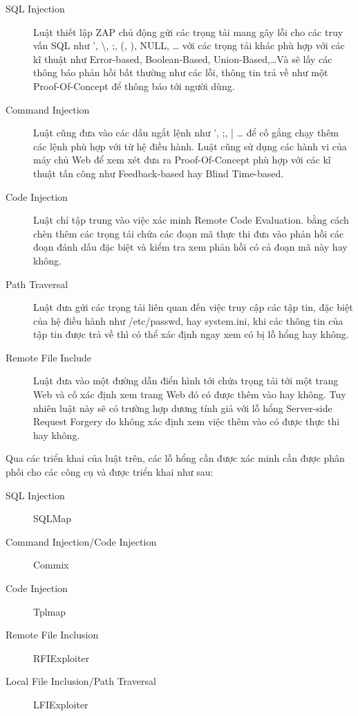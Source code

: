 \documentclass[./../main.tex]{subfiles}
\begin{document}
\begin{description}
	\item[SQL Injection] Luật thiết lập ZAP chủ động gửi các trọng tải mang
	      gây lỗi cho các truy vấn SQL như ', \textbackslash, ;, (, ), NULL, \ldots
	      với các trọng tải khác phù hợp với các kĩ thuật như Error-based, Boolean-Based,
	      Union-Based,\ldots Và sẽ lấy các thông báo phản hồi bất thường như
	      các lỗi, thông tin trả về như một Proof-Of-Concept để thông báo tới
	      người dùng.
	\item[Command Injection] Luật cũng đưa vào các dấu ngắt lệnh như ', ;, | \ldots
	      để cố gắng chạy thêm các lệnh phù hợp với từ hệ điều hành. Luật cũng
	      sử dụng các hành vi của máy chủ Web để xem xét đưa ra Proof-Of-Concept
	      phù hợp với các kĩ thuật tấn công như Feedback-based hay Blind Time-based.
	\item[Code Injection] Luật chỉ tập trung vào việc xác minh Remote Code Evaluation.
	      bằng cách chèn thêm các trọng tải chứa các đoạn mã thực thi đưa
	      vào phản hồi các đoạn đánh dấu đặc biệt và kiểm tra xem phản hồi
	      có cả đoạn mã này hay không.
	\item[Path Traversal] Luật đưa gửi các trọng tải liên quan đến việc truy
	      cập các tập tin, đặc biệt của hệ điều hành như /etc/passwd, hay system.ini,
	      khi các thông tin của tập tin được trả về thì có thể xác định ngay xem
	      có bị lỗ hổng hay không.
	\item[Remote File Include] Luật đưa vào một đường dẫn điển hình tới
	      chứa trọng tải tới một trang Web và cố xác định xem trang Web đó có được
	      thêm vào hay không. Tuy nhiên luật này sẽ có trường hợp dương tính giả
	      với lỗ hổng Server-side Request Forgery do không xác định xem việc
	      thêm vào có được thực thi hay không.

\end{description}

Qua các triển khai của luật trên, các lỗ hổng cần được xác minh cần được
phân phối cho các công cụ và được triển khai như sau:
\begin{description}
	\item[SQL Injection] SQLMap
	\item [Command Injection/Code Injection] Commix
	\item [Code Injection] Tplmap
	\item [Remote File Inclusion] RFIExploiter
	\item [Local File Inclusion/Path Traversal] LFIExploiter
\end{description}
\end{document}
